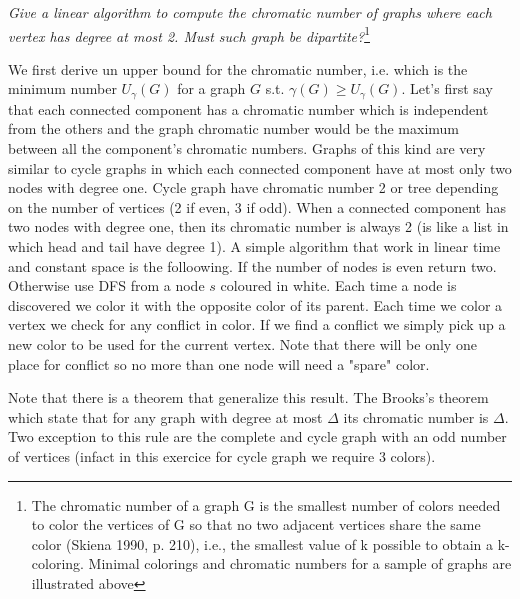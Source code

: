 \begin{problem}{\textit{Give a linear algorithm to compute the chromatic number of graphs where each vertex has degree at most 2. Must such graph be dipartite?}}\footnote{The chromatic number of a graph G is the smallest number of colors needed to color the vertices of G so that no two adjacent vertices share the same color (Skiena 1990, p. 210), i.e., the smallest value of k possible to obtain a k-coloring. Minimal colorings and chromatic numbers for a sample of graphs are illustrated above}

\begin{solution}
We first derive un upper bound for the chromatic number, i.e. which is the minimum number $U_\gamma(G)$ for a graph $G$  s.t. $\gamma(G) \geq U_\gamma(G)$. Let's first say that each connected component has a chromatic number which is independent from the others and the graph chromatic number would be the maximum between all the component's chromatic numbers.
Graphs of this kind are very similar to cycle graphs in which each connected component have at most only two nodes with degree one. 
Cycle graph have chromatic number 2 or tree depending on the number of vertices (2 if even, 3 if odd).
When a connected component has two nodes with degree one, then its chromatic number is always 2 (is like a list in which head and tail have degree 1). 
A simple algorithm that work in linear time and constant space is the folloowing. If the number of nodes is even return two. Otherwise use DFS from a node $s$ coloured in white. Each time a node is discovered we color it with the opposite color of its parent. Each time we color a vertex we check for any conflict in color. If we find a conflict we simply pick up a new color to be used for the current vertex.
Note that there will be only one place for conflict so no more than one node will need a "spare" color.

Note that there is a theorem that generalize this result. The Brooks's theorem which state that for any graph with degree at most $\Delta$ its chromatic number is $\Delta$. Two exception to this rule are the complete and cycle graph with an odd number of vertices (infact in this exercice for cycle graph we require 3 colors).



\end{solution}

\end{problem}


